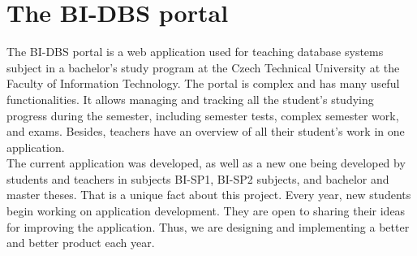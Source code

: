 \section{The BI-DBS portal}
The BI-DBS portal is a web application used for teaching database systems subject in a bachelor's study program at the Czech Technical University at the Faculty of Information Technology. The portal is complex and has many useful functionalities. It allows managing and tracking all the student's studying progress during the semester, including semester tests, complex semester work, and exams. Besides, teachers have an overview of all their student's work in one application.\\
The current application was developed, as well as a new one being developed by students and teachers in subjects BI-SP1, BI-SP2 subjects, and bachelor and master theses. That is a unique fact about this project. Every year, new students begin working on application development. They are open to sharing their ideas for improving the application. Thus, we are designing and implementing a better and better product each year.

